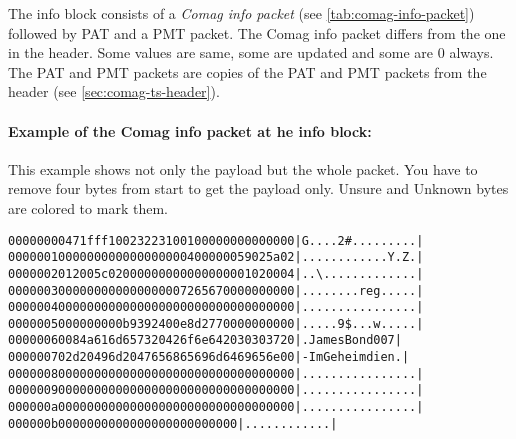 \documentclass{scrartcl}
\begin{document}
The info block consists of a \emph{Comag info packet} (see
\autoref{tab:comag-info-packet}) followed by PAT and a PMT packet. The Comag
info packet differs from the one in the header. Some values are same, some are
updated and some are 0 always. The PAT and PMT packets are copies of the PAT
and PMT packets from the header (see \autoref{sec:comag-ts-header}).

\paragraph{Example of the Comag info packet at he info block:} This example shows not only the
payload but the whole packet. You have to remove four bytes from start to get
the payload only. \textcolor{unsure}{Unsure} and \textcolor{unknown}{Unknown}
bytes are colored to mark them.

{\small
\begin{alltt}
00000000  47 1f ff 10 \textcolor{unsure}{02 32 23 10  01} 00 00 00 00 00 00 00  |G....2\#.........|
00000010  00 00 00 00 00 00 00 00  04 00 00 00 59 02 5a 02  |............Y.Z.|
00000020  12 00 5c 02 00 00 00 00  00 00 00 00 01 02 00 04  |..\textbackslash.............|
00000030  00 00 00 00 00 00 00 00  \textcolor{unsure}{72 65 67 00 00 00 00 00}  |........reg.....|
00000040  00 00 00 00 00 00 00 00  00 00 00 00 00 00 00 00  |................|
00000050  00 00 00 00 b9 39 24 00  \textcolor{unknown}{e8 d2 77 00} 00 00 00 00  |.....9\$...w.....|
00000060  08 4a 61 6d 65 73 20 42  6f 6e 64 20 30 30 37 20  |.James Bond 007 |
00000070  2d 20 49 6d 20 47 65 68  65 69 6d 64 69 65 6e 00  |- Im Geheimdien.|
00000080  00 00 00 00 00 00 00 00  00 00 00 00 00 00 00 00  |................|
00000090  00 00 00 00 00 00 00 00  00 00 00 00 00 00 00 00  |................|
000000a0  00 00 00 00 00 00 00 00  00 00 00 00 00 00 00 00  |................|
000000b0  00 00 00 00 00 00 00 00  00 00 00 00              |............|
\end{alltt}}
\end{document}
